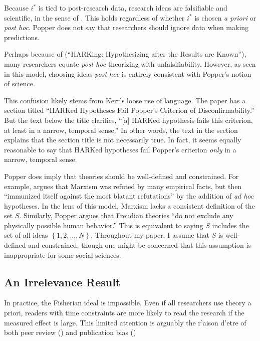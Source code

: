 \documentclass[12pt,english]{article}
\theoremstyle{plain}
\theoremstyle{plain}
\begin{document}
Because $i^\ast$ is tied to post-research data, research ideas are falsifiable and scientific, in the sense of \citet{Popper1959}. This holds regardless of whether $i^\ast$ is chosen \emph{a priori} or \emph{post hoc}. Popper does not say that researchers should ignore data when making predictions.


Perhaps because of \citet{kerr1998harking} (``HARKing: Hypothesizing after the Results are Known''), many researchers equate \emph{post hoc} theorizing with unfalsifiability. However, as seen in this model, choosing ideas \emph{post hoc} is entirely consistent with Popper's notion of science. 

This confusion likely stems from Kerr's loose use of language. The paper has a section titled  ``HARKed Hypotheses Fail Popper's Criterion of Disconfirmability.'' But the text below the title clarifies, ``[a] HARKed hypothesis fails this criterion, at least in a narrow, temporal sense.'' In other words, the text in the section explains that the section title is not necessarily true. In fact, it seems equally reasonable to say that HARKed hypotheses fail Popper's criterion \emph{only} in a narrow, temporal sense. 



Popper does imply that theories should be well-defined and constrained.  For example, \citet{Popper1985} argues that Marxism was refuted by many empirical facts, but then ``immunized itself against the most blatant refutations'' by the addition of \emph{ad hoc} hypotheses. In the lens of this model, Marxism lacks a consistent definition of the set $S$. Similarly, Popper argues that Freudian theories ``do not exclude any physically possible human behavior.'' This is equivalent to saying $S$ includes the set of all ideas $\left\{1,2,...,N\right\}$. Throughout my paper, I assume that $S$ is well-defined and constrained, though one might be concerned that this assumption is inappropriate for some social sciences.


\subsection{An Irrelevance Result}\label{sec:ez:irr}

In practice, the Fisherian ideal is impossible. Even if all researchers use theory a priori, readers with time constraints are more likely to read the research if the measured effect is large.  This limited attention is arguably the r'aison d'etre of both peer review (\citet{klamer2002attention}) and publication bias (\citet{chen2022publication})
\end{document}
